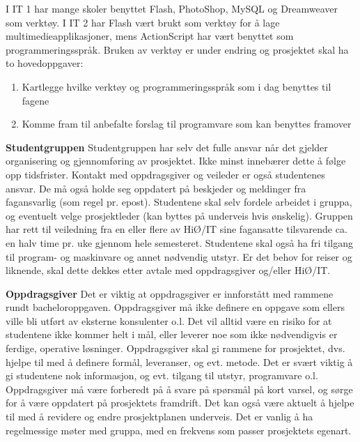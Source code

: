 \hspace{-17pt}I IT 1 har mange skoler benyttet Flash, PhotoShop, MySQL
og Dreamweaver som verktøy. I IT 2 har Flash vært brukt
som verktøy for å lage multimedieapplikasjoner, mens
ActionScript har vært benyttet som programmeringsspråk.\newline
Bruken av verktøy er under endring og prosjektet skal ha to
hovedoppgaver:
\begin{enumerate}
\item Kartlegge hvilke verktøy og programmeringsspråk
som i dag benyttes til fagene

\item Komme fram til anbefalte forslag til programvare som
kan benyttes framover

\end{enumerate}

\hspace{-17pt}\textbf{Studentgruppen}\newline
Studentgruppen har selv det fulle ansvar når det gjelder organisering og gjennomføring av prosjektet. Ikke minst innebærer dette å følge opp tidsfrister. Kontakt med oppdragsgiver og veileder er også studentenes ansvar. De må også holde seg oppdatert på beskjeder og meldinger fra fagansvarlig (som regel pr. epost). Studentene skal selv fordele arbeidet i gruppa, og eventuelt velge prosjektleder (kan byttes på underveis hvis ønskelig).
Gruppen har rett til veiledning fra en eller flere av HiØ/IT sine fagansatte tilsvarende ca. en halv time pr. uke gjennom hele semesteret. Studentene skal også ha fri tilgang til program- og maskinvare og annet nødvendig utstyr. Er det behov for reiser og liknende, skal dette dekkes etter avtale med oppdragsgiver og/eller HiØ/IT.\newline

\hspace{-17pt}\textbf{Oppdragsgiver}\newline
Det er viktig at oppdragsgiver er innforstått med rammene rundt bacheloroppgaven. Oppdragsgiver må ikke definere en oppgave som ellers ville bli utført av eksterne konsulenter o.l. Det vil alltid være en risiko for at studentene ikke kommer helt i mål, eller leverer noe som ikke nødvendigvis er ferdige, operative løsninger.
Oppdragsgiver skal gi rammene for prosjektet, dvs. hjelpe til med å definere formål, leveranser, og evt. metode. Det er svært viktig å gi studentene nok informasjon, og evt. tilgang til utstyr, programvare o.l.
Oppdragsgiver må være forberedt på å svare på spørsmål på kort varsel, og sørge for å være oppdatert på prosjektets framdrift. Det kan også være aktuelt å hjelpe til med å revidere og endre prosjektplanen underveis.
Det er vanlig å ha regelmessige møter med gruppa, med en frekvens som passer prosjektets egenart.\newline

